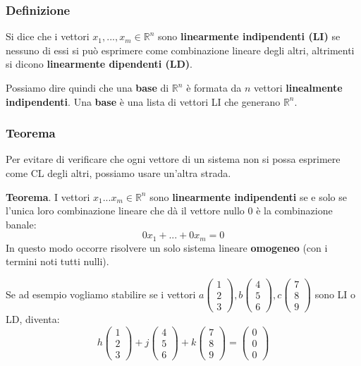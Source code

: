 \documentclass[../main.tex]{subfiles}
\begin{document}
\subsubsection{Definizione}
Si dice che i vettori $x_1,...,x_m \in \mathbb{R}^n$ sono \textbf{linearmente indipendenti (LI)} se nessuno di essi si può esprimere come combinazione lineare degli altri,
altrimenti si dicono \textbf{linearmente dipendenti (LD)}.

Possiamo dire quindi che una \textbf{base} di $\mathbb{R}^n$ è formata da $n$ vettori \textbf{linealmente indipendenti}.
Una \textbf{base} è una lista di vettori LI che generano $\mathbb{R}^n$.

\subsubsection{Teorema}
Per evitare di verificare che ogni vettore di un sistema non si possa esprimere come CL degli altri, possiamo usare un'altra strada.

\textbf{Teorema}. I vettori $x_1...x_m \in \mathbb{R}^n$ sono \textbf{linearmente indipendenti} se e solo se l'unica loro combinazione lineare
che dà il vettore nullo $0$ è la combinazione banale:
$$
    0x_1 + ... + 0x_m = 0
$$
In questo modo occorre risolvere un solo sistema lineare \textbf{omogeneo} (con i termini noti tutti nulli).

Se ad esempio vogliamo stabilire se i vettori $a \begin{pmatrix}1 \\ 2 \\ 3 \end{pmatrix}, b \begin{pmatrix}4 \\ 5 \\ 6 \end{pmatrix}, c \begin{pmatrix}7 \\ 8 \\ 9 \end{pmatrix}$
sono LI o LD, diventa:
$$
    h \begin{pmatrix}
        1 \\
        2 \\
        3
    \end{pmatrix}
    +j \begin{pmatrix}
        4 \\
        5 \\
        6
    \end{pmatrix}
    +k \begin{pmatrix}
        7 \\
        8 \\
        9
    \end{pmatrix}
    = \begin{pmatrix}
       0 \\
       0 \\
       0
    \end{pmatrix}
$$
\end{document}
